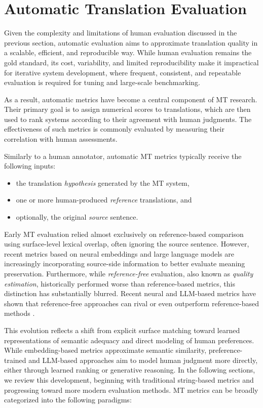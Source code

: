 \section{Automatic Translation Evaluation}
\label{rw}

Given the complexity and limitations of human evaluation discussed in the previous section, automatic evaluation aims to approximate translation quality in a scalable, efficient, and reproducible way. While human evaluation remains the gold standard, its cost, variability, and limited reproducibility make it impractical for iterative system development, where frequent, consistent, and repeatable evaluation is required for tuning and large-scale benchmarking.

As a result, automatic metrics have become a central component of MT research. Their primary goal is to assign numerical scores to translations, which are then used to rank systems according to their agreement with human judgments. The effectiveness of such metrics is commonly evaluated by measuring their correlation with human assessments.

Similarly to a human annotator, automatic MT metrics typically receive the following inputs:
\begin{itemize}
    \item the translation \textit{hypothesis} generated by the MT system,    
    \item one or more human-produced \textit{reference} translations, and
    \item optionally, the original \textit{source} sentence.
\end{itemize}
 
Early MT evaluation relied almost exclusively on reference-based comparison using surface-level lexical overlap, often ignoring the source sentence. However, recent metrics based on neural embeddings and large language models are increasingly incorporating source-side information to better evaluate meaning preservation. Furthermore, while \textit{reference-free} evaluation, also known as \textit{quality estimation}, historically performed worse than reference-based metrics, this distinction has substantially blurred. Recent neural and LLM-based metrics have shown that reference-free approaches can rival or even outperform reference-based methods \citep{freitag-etal-2021-results, rei-etal-2021-references, Moosa2024MTRankerRM}.

This evolution reflects a shift from explicit surface matching toward learned representations of semantic adequacy and direct modeling of human preferences. While embedding-based metrics approximate semantic similarity, preference-trained and LLM-based approaches aim to model human judgment more directly, either through learned ranking or generative reasoning. In the following sections, we review this development, beginning with traditional string-based metrics and progressing toward more modern evaluation methods. MT metrics can be broadly categorized into the following paradigms:

